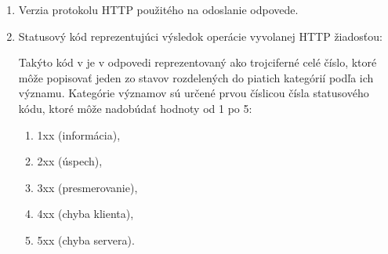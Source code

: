 \begin{enumerate}
    \item Verzia protokolu HTTP použitého na odoslanie odpovede.

    \item Statusový kód reprezentujúci výsledok operácie vyvolanej HTTP žiadosťou:

    Takýto kód v je v odpovedi reprezentovaný ako trojciferné celé číslo, ktoré môže popisovať jeden
    zo stavov rozdelených do piatich kategórií podľa ich významu. 
    Kategórie významov sú určené prvou číslicou čísla statusového kódu, ktoré môže nadobúdať hodnoty od 1 po 5:

    \begin{enumerate}
        \item 1xx (informácia),
        
        
        \item 2xx (úspech),
        
        
        \item 3xx (presmerovanie),
        
        
        \item 4xx (chyba klienta),

        
        \item 5xx (chyba servera).

    \end{enumerate}


\end{enumerate}

